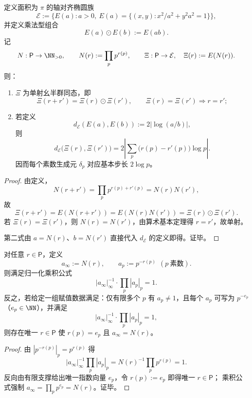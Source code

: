 \begin{theorem}[面积守恒椭圆族与素数寄存器同态实现]\label{thm:xi-prime-register-ellipse-monoid-homomorphism}
定义面积为 \(\pi\) 的轴对齐椭圆族
\[
\mathcal E:=\{E(a):a>0,\ E(a)=\{(x,y):x^2/a^2+y^2a^2=1\}\},
\]
并定义乘法型组合
\[
E(a)\odot E(b):=E(ab).
\]
记
\[
N:\mathsf P\to\NN_{>0},\qquad N(r):=\prod_{p}p^{r(p)},
\qquad
\Xi:\mathsf P\to\mathcal E,\quad \Xi(r):=E(N(r)).
\]
则：
\begin{enumerate}
  \item \(\Xi\) 为单射幺半群同态，即
  \[
  \Xi(r+r')=\Xi(r)\odot\Xi(r'),\qquad
  \Xi(r)=\Xi(r')\Rightarrow r=r';
  \]
  \item 若定义
  \[
  d_{\mathcal E}(E(a),E(b)):=2|\log(a/b)|,
  \]
  则
  \[
  d_{\mathcal E}\bigl(\Xi(r),\Xi(r')\bigr)
  =2\left|\sum_p\bigl(r(p)-r'(p)\bigr)\log p\right|.
  \]
  因而每个素数生成元 \(\delta_p\) 对应基本步长 \(2\log p\)。
\end{enumerate}
\end{theorem}
\begin{proof}
由定义，
\[
N(r+r')=\prod_p p^{r(p)+r'(p)}=N(r)N(r'),
\]
故
\[
\Xi(r+r')=E(N(r+r'))=E(N(r)N(r'))=\Xi(r)\odot\Xi(r').
\]
若 \(\Xi(r)=\Xi(r')\)，则 \(N(r)=N(r')\)，由算术基本定理得 \(r=r'\)，故单射。

第二式由 \(a=N(r)\)、\(b=N(r')\) 直接代入 \(d_{\mathcal E}\) 的定义即得。证毕。
\end{proof}

\begin{proposition}[信息守恒外置与范数一致性]\label{prop:xi-prime-externalization-norm-one-consistency}
对任意 \(r\in\mathsf P\)，定义
\[
a_\infty:=N(r),\qquad a_p:=p^{-r(p)}\ \ (p\ \text{素数}).
\]
则满足归一化乘积公式
\[
|a_\infty|_\infty^{-1}\cdot\prod_p |a_p|_p=1.
\]
反之，若给定一组赋值数据满足：仅有限多个 \(p\) 有 \(a_p\neq 1\)，且每个 \(a_p\) 可写为 \(p^{-e_p}\)（\(e_p\in\NN\)），并满足
\[
|a_\infty|_\infty^{-1}\cdot\prod_p |a_p|_p=1,
\]
则存在唯一 \(r\in\mathsf P\) 使 \(r(p)=e_p\) 且 \(a_\infty=N(r)\)。
\end{proposition}
\begin{proof}
由 \(|p^{-r(p)}|_p=p^{r(p)}\) 得
\[
|a_\infty|_\infty^{-1}\prod_p |a_p|_p
=N(r)^{-1}\prod_p p^{r(p)}
=1.
\]
反向由有限支撑给出唯一指数向量 \(e_p\)，令 \(r(p):=e_p\) 即得唯一 \(r\in\mathsf P\)；
乘积公式强制 \(a_\infty=\prod_p p^{e_p}=N(r)\)。证毕。
\end{proof}

